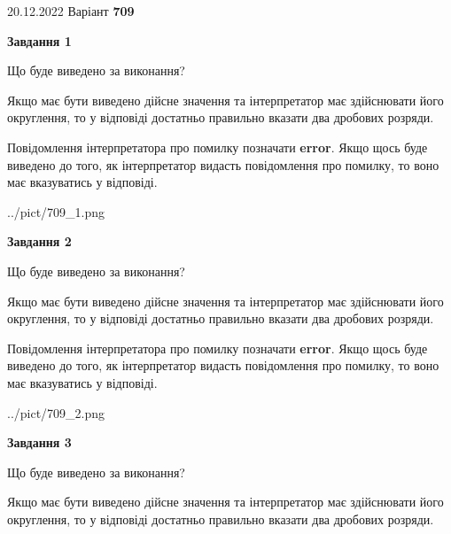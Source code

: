 \documentclass[12pt, ukrainian]{article}
\begin{document}
{20.12.2022 Варіант \No \textbf { 709 }\par}
{
\begin {Large}

{\begin {center}\textbf{Завдання 1}\end {center}}\par
Що буде виведено за виконання? \par

Якщо має бути виведено дійсне значення та інтерпретатор має здійснювати його округлення, 
то у відповіді достатньо правильно вказати два дробових розряди.

Повідомлення інтерпретатора про помилку позначати \textbf{error}.
Якщо щось буде виведено до того, як інтерпретатор видасть повідомлення про помилку, 
то воно має вказуватись у відповіді. \par

\begin{center}
	{../pict/709_1.png}
\end{center}
\newpage

{\begin {center}\textbf{Завдання 2}\end {center}}\par
Що буде виведено за виконання? \par

Якщо має бути виведено дійсне значення та інтерпретатор має здійснювати його округлення, 
то у відповіді достатньо правильно вказати два дробових розряди.

Повідомлення інтерпретатора про помилку позначати \textbf{error}.
Якщо щось буде виведено до того, як інтерпретатор видасть повідомлення про помилку, 
то воно має вказуватись у відповіді. \par

\begin{center}
	{../pict/709_2.png}
\end{center}
\newpage

{\begin {center}\textbf{Завдання 3}\end {center}}\par
Що буде виведено за виконання? \par

Якщо має бути виведено дійсне значення та інтерпретатор має здійснювати його округлення, 
то у відповіді достатньо правильно вказати два дробових розряди.


\end{Large}}
\end{document}
